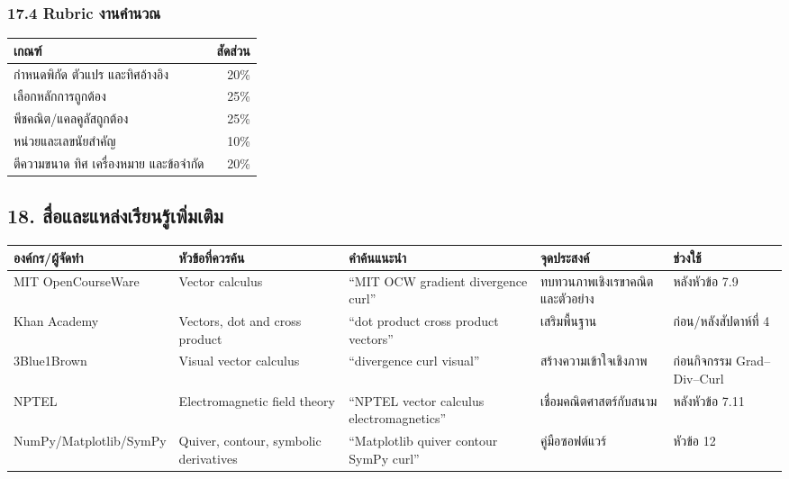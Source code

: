 \subsubsection{17.4 Rubric งานคำนวณ}

\begin{table}[htbp]
    \centering
    \begin{tabularx}{0.78\textwidth}{Y r}
        \hline
        \textbf{เกณฑ์} & \textbf{สัดส่วน} \\
        \hline
        กำหนดพิกัด ตัวแปร และทิศอ้างอิง & 20\% \\
        เลือกหลักการถูกต้อง & 25\% \\
        พีชคณิต/แคลคูลัสถูกต้อง & 25\% \\
        หน่วยและเลขนัยสำคัญ & 10\% \\
        ตีความขนาด ทิศ เครื่องหมาย และข้อจำกัด & 20\% \\
        \hline
    \end{tabularx}
\end{table}

\subsection{18. สื่อและแหล่งเรียนรู้เพิ่มเติม}

\begin{table}[htbp]
    \centering
    \small
    \begin{tabularx}{\textwidth}{L{0.20\textwidth} L{0.20\textwidth} L{0.22\textwidth} L{0.22\textwidth} Y}
        \hline
        \textbf{องค์กร/ผู้จัดทำ} & \textbf{หัวข้อที่ควรค้น} & \textbf{คำค้นแนะนำ} & \textbf{จุดประสงค์} & \textbf{ช่วงใช้} \\
        \hline
        MIT Open\-Course\-Ware & Vector calculus & ``MIT OCW gradient divergence curl'' & ทบทวนภาพเชิงเรขาคณิตและตัวอย่าง & หลังหัวข้อ 7.9 \\
        Khan Academy & Vectors, dot and cross product & ``dot product cross product vectors'' & เสริมพื้นฐาน & ก่อน/หลังสัปดาห์ที่ 4 \\
        3Blue1Brown & Visual vector calculus & ``divergence curl visual'' & สร้างความเข้าใจเชิงภาพ & ก่อนกิจกรรม Grad--Div--Curl \\
        NPTEL & Electro\-magnetic field theory & ``NPTEL vector calculus electromagnetics'' & เชื่อมคณิตศาสตร์กับสนาม & หลังหัวข้อ 7.11 \\
        NumPy/Matplotlib/SymPy & Quiver, contour, symbolic derivatives & ``Matplotlib quiver contour SymPy curl'' & คู่มือซอฟต์แวร์ & หัวข้อ 12 \\
        \hline
    \end{tabularx}
\end{table}

